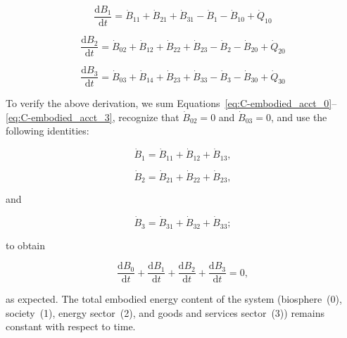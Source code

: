 \begin{equation} \label{eq:C-embodied_acct_1}
	\frac{\mathrm{d}B_{1}}{\mathrm{d}t} 	 
	= \dot{B}_{11}
	+ \dot{B}_{21} 
	+ \dot{B}_{31} 
	- \dot{B}_{1}
	- \dot{B}_{10}
	+ \dot{Q}_{10} 
\end{equation}

\begin{equation} \label{eq:C-embodied_acct_2}
	\frac{\mathrm{d}B_{2}}{\mathrm{d}t} 	 
	= \dot{B}_{02} 
	+ \dot{B}_{12}
	+ \dot{B}_{22} 
	+ \dot{B}_{23} 
	- \dot{B}_{2} 
	- \dot{B}_{20}
	+ \dot{Q}_{20} 
\end{equation}

\begin{equation} \label{eq:C-embodied_acct_3}
	\frac{\mathrm{d}B_{3}}{\mathrm{d}t}	 
	= \dot{B}_{03} 
	+ \dot{B}_{14}
	+ \dot{B}_{23} 
	+ \dot{B}_{33} 
	- \dot{B}_{3} 
	- \dot{B}_{30}
	+ \dot{Q}_{30} 
\end{equation}

To verify the above derivation, 
we sum 
Equations~\ref{eq:C-embodied_acct_0}--\ref{eq:C-embodied_acct_3},
recognize that $\dot{B}_{02} = 0$ and $\dot{B}_{03} = 0$, 
and use the following identities:

\begin{equation} \label{eq:C-B_sum_1_output}
	\dot{B}_{1} 
	= \dot{B}_{11} 
	+ \dot{B}_{12} 
	+ \dot{B}_{13},
\end{equation}

\begin{equation} \label{eq:C-B_sum_2_output}
	\dot{B}_{2} 
	= \dot{B}_{21} 
	+ \dot{B}_{22} 
	+ \dot{B}_{23},
\end{equation}

\noindent and

\begin{equation} \label{eq:C-B_sum_3_output}
	\dot{B}_{3} 
	= \dot{B}_{31} 
	+ \dot{B}_{32} 
	+ \dot{B}_{33};
\end{equation}

\noindent to obtain

\begin{equation} \label{eq:C-B_sums_to_zero}
	\frac{\mathrm{d}B_{0}}{\mathrm{d}t} 
	+ \frac{\mathrm{d}B_{1}}{\mathrm{d}t} 
	+ \frac{\mathrm{d}B_{2}}{\mathrm{d}t} 
	+ \frac{\mathrm{d}B_{3}}{\mathrm{d}t} 
	= 0,
\end{equation}

\noindent as expected. The total embodied energy content of the system 
(biosphere~(0), society~(1), energy sector~(2), 
and goods and services sector~(3)) 
remains constant with respect to time.

